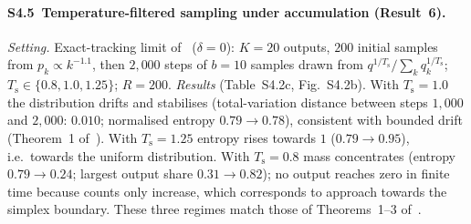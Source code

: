 \paragraph{S4.5~Temperature-filtered sampling under accumulation (Result~6).}
\emph{Setting.} Exact-tracking limit of~\cite{marchi2024heatdeath} ($\delta=0$):
$K=20$ outputs, $200$ initial samples from $p_k\propto k^{-1.1}$, then $2{,}000$
steps of $b=10$ samples drawn from $q^{1/T_{\mathrm s}}/\sum_k q_k^{1/T_{\mathrm s}}$;
$T_{\mathrm s}\in\{0.8,1.0,1.25\}$; $R=200$.
\emph{Results} (Table~S4.2c, Fig.~S4.2b). With $T_{\mathrm s}=1.0$ the distribution
drifts and stabilises (total-variation distance between steps $1{,}000$ and
$2{,}000$: $0.010$; normalised entropy $0.79\to0.78$), consistent with bounded drift
(Theorem~1 of~\cite{marchi2024heatdeath}). With $T_{\mathrm s}=1.25$ entropy rises
towards $1$ ($0.79\to0.95$), i.e.\ towards the uniform distribution. With
$T_{\mathrm s}=0.8$ mass concentrates (entropy $0.79\to0.24$; largest output share
$0.31\to0.82$); no output reaches zero in finite time because counts only increase,
which corresponds to approach towards the simplex boundary. These three regimes match
those of Theorems~1--3 of~\cite{marchi2024heatdeath}.

